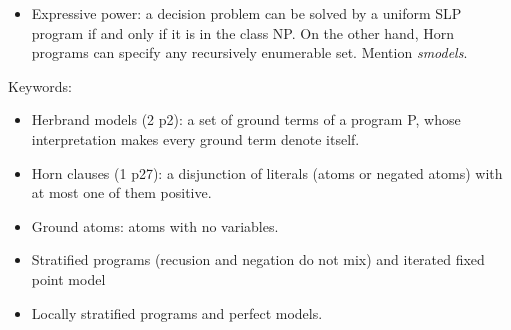 \begin{itemize}
    \item Expressive power: a decision problem can be solved by a uniform SLP program if and only if 
    it is in the class NP. On the other hand, Horn programs can specify any recursively enumerable set.
    Mention \textit{smodels}.
\end{itemize}

Keywords: 
\begin{itemize}
    \item Herbrand models (2 p2): a set of ground terms of a program P, whose interpretation 
    makes every ground term denote itself.
    \item Horn clauses (1 p27): a disjunction of literals (atoms or negated atoms) with at most one of 
    them positive.
    \item Ground atoms: atoms with no variables.
    \item Stratified programs (recusion and negation do not mix) and iterated fixed point model 
    \item Locally stratified programs and perfect models.
\end{itemize}